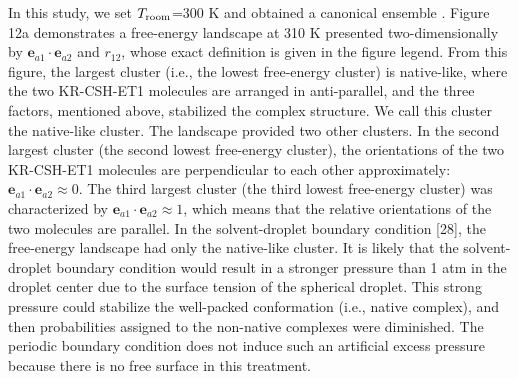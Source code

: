 In this study, we set $T_{\rm room}$=300 K and obtained a canonical ensemble . Figure 12a demonstrates a free-energy landscape at 310 K presented two-dimensionally by $\bm{e}_{a1} \cdot \bm{e}_{a2}$ and $r_{12}$, whose exact definition is given in the figure legend. From this figure, the largest cluster (i.e., the lowest free-energy cluster) is native-like, where the two KR-CSH-ET1 molecules are arranged in anti-parallel, and the three factors, mentioned above, stabilized the complex structure. We call this cluster the native-like cluster. The landscape provided two other clusters. In the second largest cluster (the second lowest free-energy cluster), the orientations of the two KR-CSH-ET1 molecules are perpendicular to each other approximately: $\bm{e}_{a1} \cdot \bm{e}_{a2} \approx 0$. The third largest cluster (the third lowest free-energy cluster) was characterized by $\bm{e}_{a1} \cdot \bm{e}_{a2} \approx 1$, which means that the relative orientations of the two molecules are parallel. In the solvent-droplet boundary condition [28], the free-energy landscape had only the native-like cluster. It is likely that the solvent-droplet boundary condition would result in a stronger pressure than 1 atm in the droplet center due to the surface tension of the spherical droplet. This strong pressure could stabilize the well-packed conformation (i.e., native complex), and then probabilities assigned to the non-native complexes were diminished. The periodic boundary condition does not induce such an artificial excess pressure because there is no free surface in this treatment.

